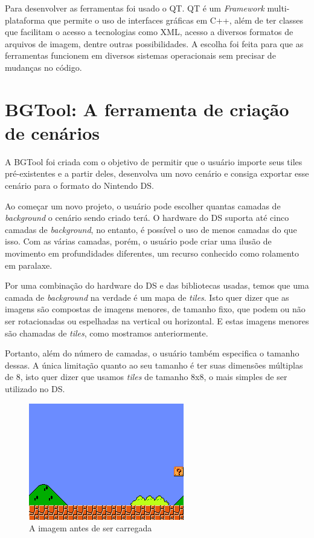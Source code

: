 \documentclass[brazil]{abnt}
\begin{document}

Para desenvolver as ferramentas foi usado o QT. QT é um \textit{Framework} multi-plataforma que permite o uso de interfaces gráficas em C++, além de ter classes que facilitam o acesso a tecnologias como XML, acesso a diversos formatos de arquivos de imagem, dentre outras possibilidades. A escolha foi feita para que as ferramentas funcionem em diversos sistemas operacionais sem precisar de mudanças no código.

\section{BGTool: A ferramenta de criação de cenários}

A BGTool foi criada com o objetivo de permitir que o usuário importe seus tiles pré-existentes e a partir deles, desenvolva um novo cenário e consiga exportar esse cenário para o formato do Nintendo DS. 

Ao começar um novo projeto, o usuário pode escolher quantas camadas de \textit{background} o cenário sendo criado terá. O hardware do DS suporta até cinco camadas de \textit{background}, no entanto, é possível o uso de menos camadas do que isso. Com as várias camadas, porém, o usuário pode criar uma ilusão de movimento em profundidades diferentes, um recurso conhecido como rolamento em paralaxe.\footnotemark


Por uma combinação do hardware do DS e das bibliotecas usadas, temos que uma camada de \textit{background} na verdade é um mapa de \textit{tiles}. Isto quer dizer que as imagens são compostas de imagens menores, de tamanho fixo, que podem ou não ser rotacionadas ou espelhadas na vertical ou horizontal. E estas imagens menores são chamadas de \textit{tiles}, como mostramos anteriormente.

Portanto, além do número de camadas, o usuário também especifica o tamanho dessas. A única limitação quanto ao seu tamanho é ter suas dimensões múltiplas de 8, isto quer dizer que usamos \textit{tiles} de tamanho 8x8, o mais simples de ser utilizado no DS.

\begin{figure}[h!]
\centering
\includegraphics[scale=1]{imgs/exemplo.png}
\caption{A imagem antes de ser carregada} 
\end{figure}
\end{document}
